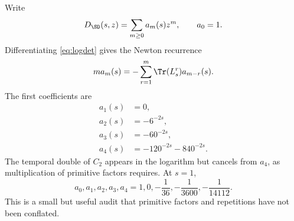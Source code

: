 Write
\[
 D_{\SD}(s,z)=\sum_{m\ge0}a_m(s)z^m,\qquad a_0=1.
\]
Differentiating \cref{eq:logdet} gives the Newton recurrence
\begin{equation}
\label{eq:newton}
 ma_m(s)=-\sum_{r=1}^m\Tr(L_s^r)a_{m-r}(s).
\end{equation}
The first coefficients are
\begin{align*}
a_1(s)&=0,\\
a_2(s)&=-6^{-2s},\\
a_3(s)&=-60^{-2s},\\
a_4(s)&=-120^{-2s}-840^{-2s}.
\end{align*}
The temporal double of \(C_2\) appears in the logarithm but cancels from
\(a_4\), as multiplication of primitive factors requires.  At \(s=1\),
\[
 a_0,a_1,a_2,a_3,a_4
 =
 1,0,-\frac1{36},-\frac1{3600},-\frac1{14112}.
\]
This is a small but useful audit that primitive factors and repetitions have
not been conflated.
